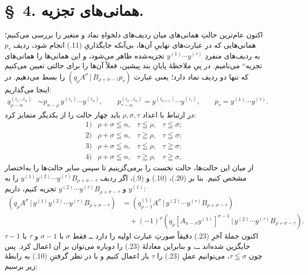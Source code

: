\documentclass[11pt]{article}
\providecommand{\glqq}{\textquotedblbase}
\providecommand{\grqq}{\textquotedblleft}
\providecommand{\pair}[2]{(#1\,|\,#2)}
\begin{document}
\section*{\S\ 4. همانی‌های تجزیه.}
اکنون عام‌ترین حالتِ همانی‌های میان ردیف‌های دلخواهِ نماد و متغیر را بررسی می‌کنیم؛ همانی‌هایی که در عبارت‌های نهاییِ آن‌ها، بی‌آنکه جایگذاریِ (11.) انجام شود، ردیف $p_\tau$ به ردیف‌های منفردِ $y^{(1)}\cdots y^{(\tau)}$ تجزیه‌شده ظاهر می‌شود، و این همانی‌ها را \glqq{}همانی‌های تجزیه\grqq{} می‌نامیم. در پیِ ملاحظهٔ پایانِ بند پیشین، فعلاً آن‌ها را برای حالتی تعیین می‌کنیم که تنها دو ردیف نماد دارد؛ یعنی عبارت $\pair{q_\rho A^\sigma}{B_{\rho+\sigma-\tau}p_\tau}$ را بسط می‌دهیم. در اینجا می‌گذاریم:
\begin{equation}
\begin{aligned}
q_{\rho-\alpha}^{(i_1\ldots i_\alpha)}&\sim p_{n-\rho}\,y^{(i_1)}\cdots y^{(i_\alpha)},\qquad
p_{\tau-\alpha}^{(i_1\ldots i_\alpha)}=y^{(i_{\alpha+1})}\cdots y^{(i_\tau)},\qquad
p_\tau=y^{(1)}\cdots y^{(\tau)}.
\end{aligned}
\tag{22}
\end{equation}
در ارتباط با اعداد $\rho,\sigma,\tau$ باید چهار حالت را از یکدیگر متمایز کرد:
\[
\begin{array}{llll}
1)&\rho+\sigma\leqq n,& \tau\leqq\rho,& \tau\leqq\sigma;\\[2pt]
2)&\rho+\sigma\leqq n,& \tau\geqq\rho,& \tau\leqq\sigma;\\[2pt]
3)&\rho+\sigma\leqq n,& \tau\leqq\rho,& \tau\geqq\sigma;\\[2pt]
4)&\rho+\sigma\leqq n,& \tau\geqq\rho,& \tau\geqq\sigma,
\end{array}
\]
از میان این حالت‌ها، حالت نخست را برمی‌گزینیم تا سپس سایر حالت‌ها را به‌اختصار مشخص کنیم. بنا بر (20.)، (10.) و (9.)، اگر ردیف $y^{(1)}y^{(2)}\cdots y^{(\tau)}B_{\rho+\sigma-\tau}$ را به $y^{(1)}$ و $y^{(2)}\cdots y^{(\tau)}B_{\rho+\sigma-\tau}$ تجزیه کنیم، داریم:
\begin{equation}
\begin{aligned}
\pair{q_\rho A^\sigma}{y^{(1)}y^{(2)}\cdots y^{(\tau)}B_{\rho+\sigma-\tau}}
&=\pair{q_{\rho-1}^{(1)}A^\sigma}{y^{(2)}\cdots y^{(\tau)}B_{\rho+\sigma-\tau}}\\
&\quad+(-1)^\rho\pair{q_\rho[A_{n-\sigma}y^{(1)}]^{\sigma-1}}{y^{(2)}\cdots y^{(\tau)}B_{\rho+\sigma-\tau}}.
\end{aligned}
\tag{23}
\end{equation}
اکنون جملهٔ آخرِ (23.) دقیقاً صورتِ عبارت اولیه را دارد ــ فقط $\sigma$ با $\sigma-1$ و $\tau$ با $\tau-1$ جایگزین شده‌اند ــ، و بنابراین معادلهٔ (23.) را دوباره می‌توان بر آن اعمال کرد. پس چون $\tau\leqq\sigma$، می‌توانیم عملِ (23.) را $\tau$ بار اعمال کنیم و با در نظر گرفتنِ (10.) به رابطهٔ زیر برسیم:
\end{document}
